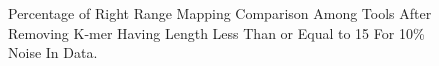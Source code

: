\begin{frame}
\begin{figure}
		\caption{Percentage of Right Range Mapping Comparison Among Tools After Removing K-mer Having Length Less Than or Equal to 15 For 10\% Noise In Data.} 
	\end{figure}
\end{frame}

